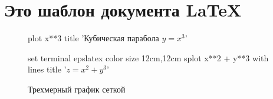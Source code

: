 \documentclass[a4paper,12pt]{article} %
\begin{document}
	
\thispagestyle{fancy}

\section{Это шаблон документа \LaTeX}

\begin{figure}[h]
	\centering
	\begin{gnuplot}[terminal=epslatex]
		plot x**3 title 'Кубическая парабола $y = x^3$'
	\end{gnuplot}
\end{figure}

\begin{figure}[h]
	\centering
	\begin{gnuplot}[terminal=epslatex]
		set terminal epslatex color size 12cm,12cm
		splot x**2 + y**3 with lines title '$z = x^2 + y^3$'
	\end{gnuplot}
	\caption{Трехмерный график сеткой}
\end{figure}
\end{document}
